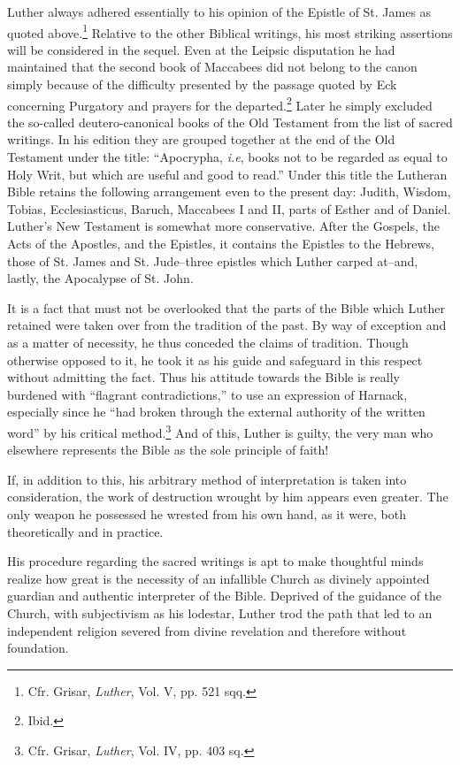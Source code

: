 Luther always adhered essentially to his opinion of the Epistle of St. James
as quoted above.\footnote{Cfr. Grisar, \textit{Luther}, Vol. V, pp. 521 sqq.}
Relative to the other Biblical writings, his most striking
assertions will be considered in the sequel. Even at the Leipsic disputation
he had maintained that the second book of Maccabees did not belong to the
canon simply because of the difficulty presented by the passage quoted by
Eck concerning Purgatory and prayers for the departed.\footnote{Ibid.}
Later he simply
excluded the so-called deutero-canonical books of the Old Testament from
the list of sacred writings. In his edition they are grouped together at the
end of the Old Testament under the title: “Apocrypha, \textit{i.e}, books not to be
regarded as equal to Holy Writ, but which are useful and good to read.”
Under this title the Lutheran Bible retains the following arrangement even
to the present day: Judith, Wisdom, Tobias, Ecclesiasticus, Baruch, Maccabees
I and II, parts of Esther and of Daniel. Luther’s New Testament is
somewhat more conservative. After the Gospels, the Acts of the Apostles,
and the Epistles, it contains the Epistles to the Hebrews, those of St. James
and St. Jude--three epistles which Luther carped at--and, lastly, the
Apocalypse of St. John.

It is a fact that must not be overlooked that the parts of the Bible
which Luther retained were taken over from the tradition of the
past. By way of exception and as a matter of necessity, he thus
conceded the claims of tradition. Though otherwise opposed to it,
he took it as his guide and safeguard in this respect without admitting
the fact. Thus his attitude towards the Bible is really burdened
with “flagrant contradictions,” to use an expression of
Harnack, especially since he “had broken through the external authority of the
written word” by his critical method.\footnote{Cfr. Grisar, \textit{Luther}, Vol. IV, pp. 403 sq.}
And of this, Luther is guilty,
the very man who elsewhere represents the Bible as the sole principle
of faith!

If, in addition to this, his arbitrary method of interpretation is
taken into consideration, the work of destruction wrought by him
appears even greater. The only weapon he possessed he wrested from
his own hand, as it were, both theoretically and in practice.

His procedure regarding the sacred writings is apt to make
thoughtful minds realize how great is the necessity of an infallible
Church as divinely appointed guardian and authentic interpreter
of the Bible. Deprived of the guidance of the Church, with subjectivism
as his lodestar, Luther trod the path that led to an independent
religion severed from divine revelation and therefore without
foundation.
